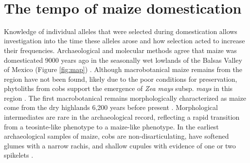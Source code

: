 \documentclass[9pt,twocolumn,twoside]{rilabRxiv}
\begin{document}
 ﻿\section*{The tempo of maize domestication}

﻿Knowledge of individual alleles that were selected during domestication allows investigation into the time these alleles arose and how selection acted to increase their frequencies.
Archaeological and molecular methods agree that maize was domesticated 9000 years ago in the seasonally wet lowlands of the Balsas Valley of Mexico (Figure \ref{fig:map})  \citep{matsuoka2002, piperno2009, ranere2009}.
Although macrobotanical maize remains from the region have not been found, likely due to the poor conditions for preservation, phytoliths from cobs support the emergence of \textit{Zea mays} subsp. \textit{mays} in this region \citep{piperno2009}.
The first macrobotanical remains morphologically characterized as maize come from the dry highlands 6,200 years before present \citep{mangelsdorf1967, benz2001, piperno2001}.
﻿Morphological intermediates are rare in the archaeological record, reflecting a rapid transition from a teosinte-like phenotype to a maize-like phenotype.
In the earliest archaeological samples of maize, cobs are non-disarticulating, have softened glumes with a narrow rachis, and shallow cupules with evidence of one or two spikelets \citep{mangelsdorf1974, benz2001,  kennett2017}.
\end{document}

